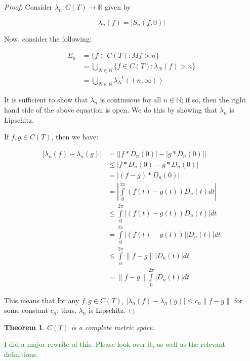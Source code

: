 \documentclass{amsart}
\newcommand{\la}{\lambda}
\newcommand{\N}{\mathbb{N}}
\newcommand{\R}{\mathbb{R}}
\newcommand{\colorcomment}[2]{\textcolor{#1}{#2}} %
\newcommand{\absval}[1]{\left| #1 \right|}
\newcommand{\norm}[1]{\|#1\|}
\newtheorem{thm}{Theorem}[section]
\theoremstyle{definition}
\begin{document}
\begin{proof}
Consider $\la_n: C(T) \to \R$ given by

\begin{displaymath}
\la_n(f) = \absval{S_n(f,0)}
\end{displaymath}

Now, consider the following:

\begin{align*}
E_n &= \{f \in C(T): Mf> n\} \\
&= \bigcup\limits_{N \in \N} \{f \in C(T) : \la_N (f)> n\}\\
&= \bigcup\limits_{N \in \N} \la_N^{-1}((n, \infty))
\end{align*}

It is sufficient to show that $\la_n$ is continuous for all $n \in \N$; if so, then the right hand side of the above equation is open.
We do this by showing that $\la_n$ is Lipschitz.

If $f, g \in C(T)$, then we have:

\begin{align*}
\absval{\la_n(f) - \la_n(g)} &= \absval{\absval{f \ast D_n(0)} - \absval{g \ast D_n(0)}} \\
&\leq \absval{f \ast D_n(0) - g \ast D_n(0)} \\
&= \absval{(f-g) \ast D_n(0)} \\
&= \absval{\int\limits_0^{2\pi} (f(t)-g(t))D_n(t)dt} \\
&\leq \int\limits_0^{2\pi} \absval{(f(t)-g(t))D_n(t)}dt \\
&= \int\limits_0^{2\pi} \absval{(f(t)-g(t))}\absval{D_n(t)}dt \\
&\leq \int\limits_0^{2\pi} \norm{f-g}\absval{D_n(t)}dt \\
&= \norm{f-g} \int\limits_0^{2\pi} \absval{D_n(t)}dt
\end{align*}

This means that for any $f,g \in C(T)$, $\absval{\la_n(f) - \la_n(g)} \leq c_n \norm{f-g}$ for some constant $c_n$; thus, $\la_n$ is Lipschitz.

\end{proof}

\begin{thm}
$C(T)$ is a complete metric space. %
\end{thm}

\colorcomment{Green}{I did a major rewrite of this. Please look over it, as well as the relevant definitions.}
\end{document}
